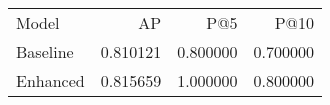 \begin{tabular}{lrrr}
Model & AP & P@5 & P@10 \\
Baseline & 0.810121 & 0.800000 & 0.700000 \\
Enhanced & 0.815659 & 1.000000 & 0.800000 \\
\end{tabular}
